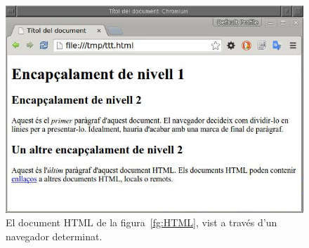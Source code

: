 \begin{figure}
\begin{center}
\includegraphics[scale=0.5]{vista-chromium.jpg}
  \end{center}
\caption{El document HTML de la figura~\protect\ref{fg:HTML}, vist a
  través d'un navegador determinat.}
\label{fg:HTMLnav}

\end{figure}








